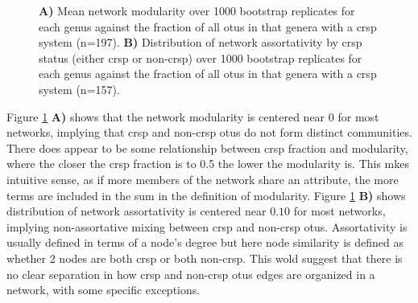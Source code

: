 \FloatBarrier
\begin{figure}[htb!]
    \caption{\textbf{A)} Mean network modularity over 1000 bootstrap replicates for each genus against the fraction of all \ac{otu}s in that genera with a \ac{crsp} system  (n=197).
    \textbf{B)}  Distribution of network assortativity by \ac{crsp} status (either \ac{crsp} or non-\ac{crsp}) over 1000 bootstrap replicates for each genus against the fraction of all \ac{otu}s in that genera with a \ac{crsp} system  (n=157).}
    \label{asso_mod}
\end{figure}
\FloatBarrier
Figure \ref{asso_mod} \textbf{A)} shows that the network modularity is centered near $0$ for most networks, implying that \ac{crsp} and non-\ac{crsp} \ac{otu}s do not form distinct communities.
There does appear to be some relationship between \ac{crsp} fraction and modularity, where the closer the \ac{crsp} fraction is to 0.5 the lower the modularity is.
This mkes intuitive sense, as if more members of the network share an attribute, the more terms are included in the sum in the definition of modularity.
Figure \ref{asso_mod} \textbf{B)} shows distribution of network assortativity is centered near $0.10$ for most networks, implying non-assortative mixing between \ac{crsp} and non-\ac{crsp} \ac{otu}s.
Assortativity is usually defined in terms of a node's degree but here node similarity is defined as whether 2 nodes are both \ac{crsp} or both non-\ac{crsp}.
This wold suggest that there is no clear separation in how \ac{crsp} and non-\ac{crsp} \ac{otu}s edges are organized in a network, with some specific exceptions.


